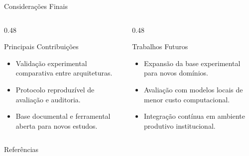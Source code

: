 \documentclass[aspectratio=169, 11pt]{beamer}
\begin{document}
\begin{frame}{Considerações Finais}
  \begin{columns}[T, onlytextwidth]
    \begin{column}{0.48\textwidth}
      \begin{block}{Principais Contribuições}
        \begin{itemize}
          \item Validação experimental comparativa entre arquiteturas.
          \item Protocolo reproduzível de avaliação e auditoria.
          \item Base documental e ferramental aberta para novos estudos.
        \end{itemize}
      \end{block}
    \end{column}
    \begin{column}{0.48\textwidth}
      \begin{exampleblock}{Trabalhos Futuros}
        \begin{itemize}
          \item Expansão da base experimental para novos domínios.
          \item Avaliação com modelos locais de menor custo computacional.
          \item Integração contínua em ambiente produtivo institucional.
        \end{itemize}
      \end{exampleblock}
    \end{column}
  \end{columns}
\end{frame}

\begin{frame}[allowframebreaks]{Referências}
  \printbibliography[heading=none]
\end{frame}
\end{document}

